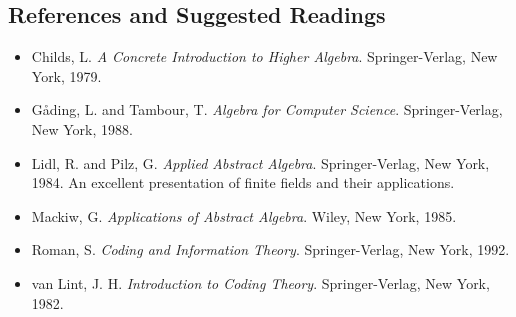 \subsection*{References and Suggested Readings}
 

{\small

\begin{itemize}
 
\item[{\bf [1]}]
Childs, L. {\it A Concrete Introduction to Higher Algebra}.
Springer-Verlag, New York, 1979.

\item[{\bf [2]}]
G{\aa}ding, L. and Tambour, T. {\it Algebra for Computer
Science}. Springer-Verlag, New York, 1988.

\item[{\bf [3]}]
Lidl, R. and Pilz, G. {\it Applied Abstract Algebra}.
Springer-Verlag, New York, 1984. An excellent presentation of finite
fields and their applications.

\item[{\bf [4]}]
Mackiw, G. {\it Applications of Abstract Algebra}. Wiley,
New York, 1985.
 
\item[{\bf [5]}]
Roman, S. {\it Coding and Information Theory}. Springer-Verlag,
New York, 1992. 


\item[{\bf [6]}]
van Lint, J. H. {\it Introduction to Coding Theory}.
Springer-Verlag, New York, 1982.
 
\end{itemize}
}






